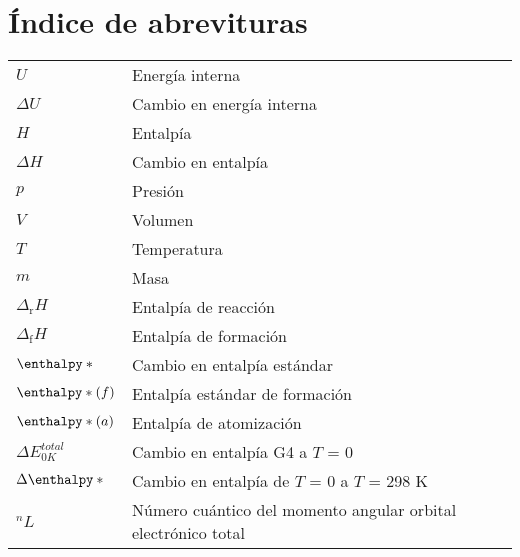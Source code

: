 

\chapter*{Índice de abrevituras}

\begin{tabular}{ll}

$U$ & Energía interna \\ 

$\Delta U$ & Cambio en energía interna \\
 
$H$ & Entalpía \\ 

$\Delta H$ & Cambio en entalpía \\

$p$ & Presión \\ 

$V$ & Volumen \\ 

$T$ & Temperatura \\

$m$ & Masa \\

	$\Delta _{\mathrm{r}}H$ & Entalpía de reacción \\

	$\Delta _{\mathrm{f}}H$ & Entalpía de formación \\ 
 
	$\enthalpy*{}$ & Cambio en entalpía estándar \\ 
 
	$\enthalpy*(f){}$ & Entalpía estándar de formación \\ 
 
	$\enthalpy*(a){}$ & Entalpía de atomización \\ 
 
	$\Delta E^{total}_{0 K}$ & Cambio en entalpía G4 a $T$ = 0\\ 

	$\Delta\enthalpy*{}$ & Cambio en entalpía de $T$ = 0 a $T$ = 298 K \\ 

	$^{n}L$ & Número cuántico del momento angular orbital electrónico total  \\


\end{tabular} 

\newpage

